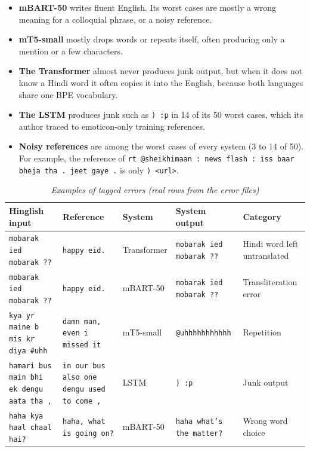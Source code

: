 \documentclass[11pt,a4paper]{article}
\begin{document}
\begin{itemize}\setlength\itemsep{0pt}
\item \textbf{mBART-50} writes fluent English. Its worst cases are mostly a wrong meaning for a colloquial phrase, or a noisy reference.
\item \textbf{mT5-small} mostly drops words or repeats itself, often producing only a mention or a few characters.
\item \textbf{The Transformer} almost never produces junk output, but when it does not know a Hindi word it often copies it into the English, because both languages share one BPE vocabulary.
\item \textbf{The LSTM} produces junk such as \texttt{) :p} in 14 of its 50 worst cases, which its author traced to emoticon-only training references.
\item \textbf{Noisy references} are among the worst cases of every system (3 to 14 of 50). For example, the reference of \texttt{rt @sheikhimaan : news flash : iss baar bheja tha . jeet gaye .} is only \texttt{) \textless{}url\textgreater{}}.
\end{itemize}
\begin{table}[t]
\caption{\textit{Examples of tagged errors (real rows from the error files)}}\label{tab:examples}
\centering
\begin{tabular}{>{\raggedright\arraybackslash\scriptsize}p{}>{\raggedright\arraybackslash\scriptsize}p{}>{\raggedright\arraybackslash\scriptsize}p{}>{\raggedright\arraybackslash\scriptsize}p{}>{\raggedright\arraybackslash\scriptsize}p{}}
\hline\hline
\textbf{Hinglish input} & \textbf{Reference} & \textbf{System} & \textbf{System output} & \textbf{Category} \\
\hline
\texttt{mobarak ied mobarak ??} & \texttt{happy eid.} & Transformer & \texttt{mobarak ied mobarak ??} & Hindi word left untranslated \\
\texttt{mobarak ied mobarak ??} & \texttt{happy eid.} & mBART-50 & \texttt{mobarak ied mobarak ??} & Transliteration error \\
\texttt{kya yr maine b mis kr diya \#uhh} & \texttt{damn man, even i missed it} & mT5-small & \texttt{@uhhhhhhhhhhh} & Repetition \\
\texttt{hamari bus main bhi ek dengu aata tha ,} & \texttt{in our bus also one dengu used to come ,} & LSTM & \texttt{) :p} & Junk output \\
\texttt{haha kya haal chaal hai?} & \texttt{haha, what is going on?} & mBART-50 & \texttt{haha what's the matter?} & Wrong word choice \\
\hline\hline
\end{tabular}
\end{table}
\end{document}
